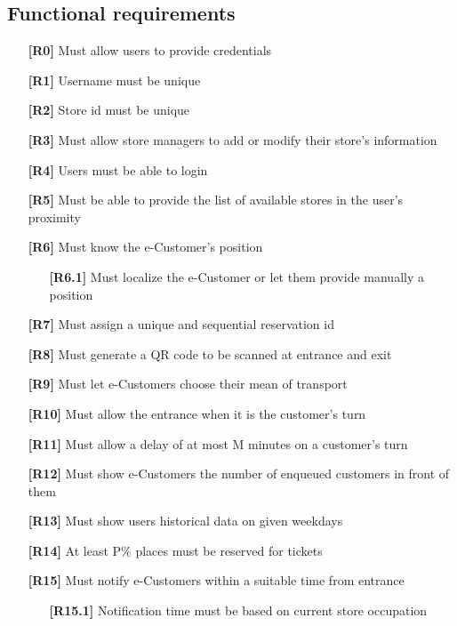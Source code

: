 \subsection{Functional requirements}

\begin{itemize}[itemsep=-1mm, topsep=-1mm]
	\item [\textbf{[R0]}] Must allow users to provide credentials
	\item [\textbf{[R1]}] Username must be unique 
	\item [\textbf{[R2]}] Store id must be unique
	\item [\textbf{[R3]}] Must allow store managers to add or modify their store’s information
	\item [\textbf{[R4]}] Users must be able to login
	\item [\textbf{[R5]}] Must be able to provide the list of available stores in the user’s proximity
	\item [\textbf{[R6]}] Must know the e-Customer’s position
	\begin{itemize}[itemsep=-1mm, topsep=-1mm]
		\item [\textbf{[R6.1]}] Must localize the e-Customer or let them provide manually a position
	\end{itemize}
	\item [\textbf{[R7]}] Must assign a unique and sequential reservation id
	\item [\textbf{[R8]}] Must generate a QR code to be scanned at entrance and exit
	\item [\textbf{[R9]}] Must let e-Customers choose their mean of transport
	\item [\textbf{[R10]}] Must allow the entrance when it is the customer’s turn
	\item [\textbf{[R11]}] Must allow a delay of at most M minutes on a customer’s turn
	\item [\textbf{[R12]}] Must show e-Customers the number of enqueued customers in front of them
	\item [\textbf{[R13]}] Must show users historical data on given weekdays
	\item [\textbf{[R14]}] At least P\% places must be reserved for tickets
	\item [\textbf{[R15]}] Must notify e-Customers within a suitable time from entrance
	\begin{itemize}[itemsep=-1mm, topsep=-1mm]
		\item [\textbf{[R15.1]}] Notification time must be based on current store occupation

\end{itemize}
\end{itemize}
